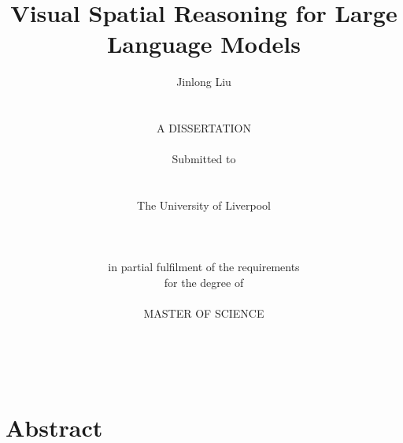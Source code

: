 \documentclass[twocolumn,11pt]{report}
\begin{document}



\thispagestyle{empty}  %

\title{\LARGE
Visual Spatial Reasoning for Large Language Models}

\author{Jinlong Liu
\\    \\    \\
A DISSERTATION
\\    \\
Submitted to 
\\    \\    \\ 
The University of Liverpool
\\    \\
\\    \\
in partial fulfilment of the requirements
\\
for the degree of 
\\     \\
MASTER OF SCIENCE
\\     \\    \\    \\
}


\date{}


\maketitle
\onecolumn

\chapter*{\center Abstract}
\end{document}
